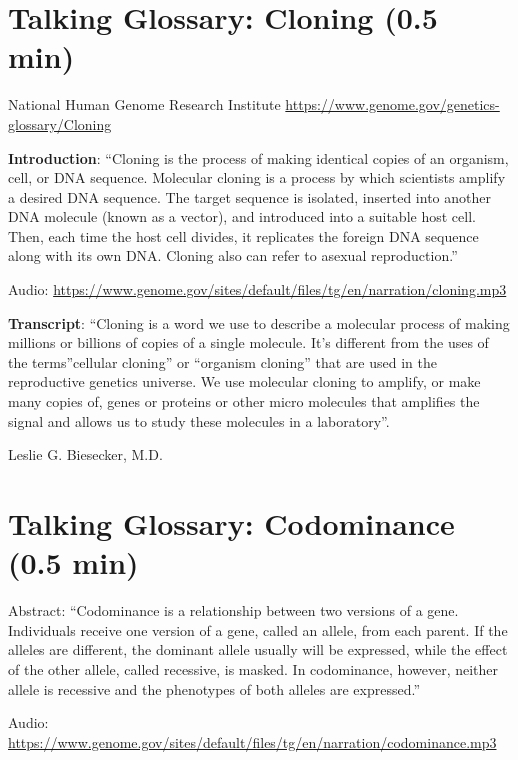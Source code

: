 \documentclass[
]{book}
\begin{document}
\hypertarget{talking-glossary-cloning-0.5-min}{%
\section{Talking Glossary: Cloning (0.5 min)}\label{talking-glossary-cloning-0.5-min}}

National Human Genome Research Institute
\url{https://www.genome.gov/genetics-glossary/Cloning}

\textbf{Introduction}: ``Cloning is the process of making identical copies of an organism, cell, or DNA sequence. Molecular cloning is a process by which scientists amplify a desired DNA sequence. The target sequence is isolated, inserted into another DNA molecule (known as a vector), and introduced into a suitable host cell. Then, each time the host cell divides, it replicates the foreign DNA sequence along with its own DNA. Cloning also can refer to asexual reproduction.''

Audio: \url{https://www.genome.gov/sites/default/files/tg/en/narration/cloning.mp3}

\textbf{Transcript}: ``Cloning is a word we use to describe a molecular process of making millions or billions of copies of a single molecule. It's different from the uses of the terms''cellular cloning'' or ``organism cloning'' that are used in the reproductive genetics universe. We use molecular cloning to amplify, or make many copies of, genes or proteins or other micro molecules that amplifies the signal and allows us to study these molecules in a laboratory''.

Leslie G. Biesecker, M.D.

\hypertarget{talking-glossary-codominance-0.5-min}{%
\section{Talking Glossary: Codominance (0.5 min)}\label{talking-glossary-codominance-0.5-min}}

Abstract: ``Codominance is a relationship between two versions of a gene. Individuals receive one version of a gene, called an allele, from each parent. If the alleles are different, the dominant allele usually will be expressed, while the effect of the other allele, called recessive, is masked. In codominance, however, neither allele is recessive and the phenotypes of both alleles are expressed.''

Audio: \url{https://www.genome.gov/sites/default/files/tg/en/narration/codominance.mp3}
\end{document}
